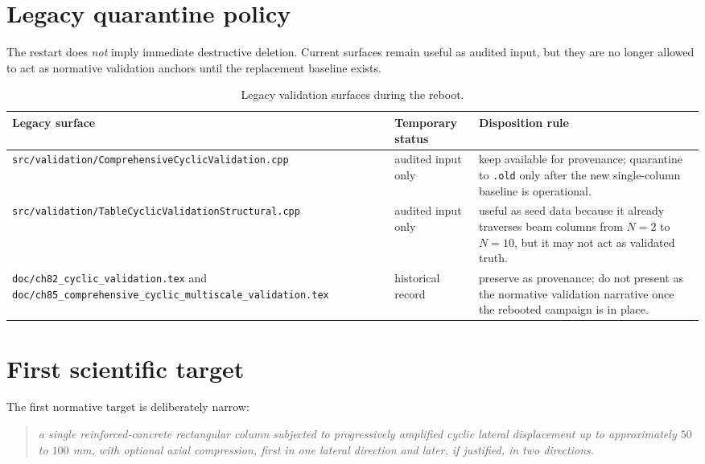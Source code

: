 \section{Legacy quarantine policy}

The restart does \emph{not} imply immediate destructive deletion.  Current
surfaces remain useful as audited input, but they are no longer allowed to act
as normative validation anchors until the replacement baseline exists.

\begin{table}[htbp]
  \centering
  \caption{Legacy validation surfaces during the reboot.}
  \label{tab:validation-legacy-policy}
  \small
  \begin{tabular}{@{}p{}p{}p{}@{}}
    \toprule
    \textbf{Legacy surface} & \textbf{Temporary status} & \textbf{Disposition rule} \\
    \midrule
    \texttt{src/validation/ComprehensiveCyclicValidation.cpp}
    & audited input only
    & keep available for provenance; quarantine to \texttt{.old} only after the
      new single-column baseline is operational. \\

    \texttt{src/validation/TableCyclicValidationStructural.cpp}
    & audited input only
    & useful as seed data because it already traverses beam columns from
      \(N=2\) to \(N=10\), but it may not act as validated truth. \\

    \texttt{doc/ch82\_cyclic\_validation.tex} and
    \texttt{doc/ch85\_comprehensive\_cyclic\_multiscale\_validation.tex}
    & historical record
    & preserve as provenance; do not present as the normative validation
      narrative once the rebooted campaign is in place. \\
    \bottomrule
  \end{tabular}
\end{table}

\section{First scientific target}

The first normative target is deliberately narrow:
\begin{quote}
  \emph{a single reinforced-concrete rectangular column subjected to
  progressively amplified cyclic lateral displacement up to approximately
  \(50\) to \(100\) mm, with optional axial compression, first in one lateral
  direction and later, if justified, in two directions.}
\end{quote}

